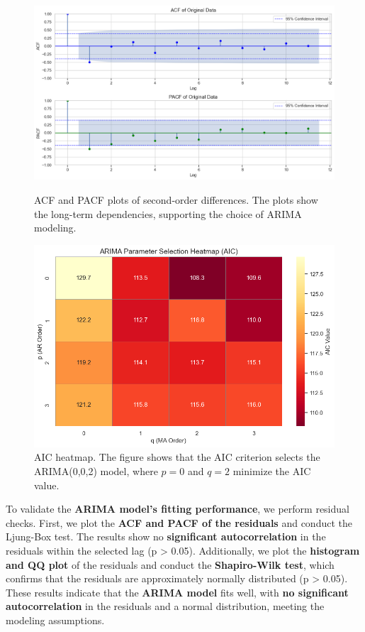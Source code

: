\documentclass{mcmthesis}  %
\begin{document}
\begin{figure}[ht]
  \centering
  \begin{minipage}[b]{0.42\textwidth}
    \includegraphics[width=\textwidth]{first_medal/3}
    \caption{ACF and PACF plots of second-order differences. The plots show the long-term dependencies, supporting the choice of ARIMA modeling.}
    \label{fig:image-a}
  \end{minipage}
  \hfill
  \begin{minipage}[b]{0.42\textwidth}
    \includegraphics[width=\textwidth]{first_medal/4}
    \caption{AIC heatmap. The figure shows that the AIC criterion selects the ARIMA(0,0,2) model, where $p = 0$ and $q = 2$ minimize the AIC value.}
    \label{fig:image-b}
  \end{minipage}
  \label{fig:images}
\end{figure}

To validate the\textbf{ ARIMA model's fitting performance}, we perform residual checks. First, we plot the \textbf{ACF and PACF of the residuals} and conduct the Ljung-Box test. The results show no \textbf{significant autocorrelation} in the residuals within the selected lag (p > 0.05). Additionally, we plot the\textbf{ histogram and QQ plot} of the residuals and conduct the \textbf{Shapiro-Wilk test}, which confirms that the residuals are approximately normally distributed (p > 0.05). These results indicate that the \textbf{ARIMA model} fits well, with \textbf{no significant autocorrelation} in the residuals and a normal distribution, meeting the modeling assumptions.
\end{document}
